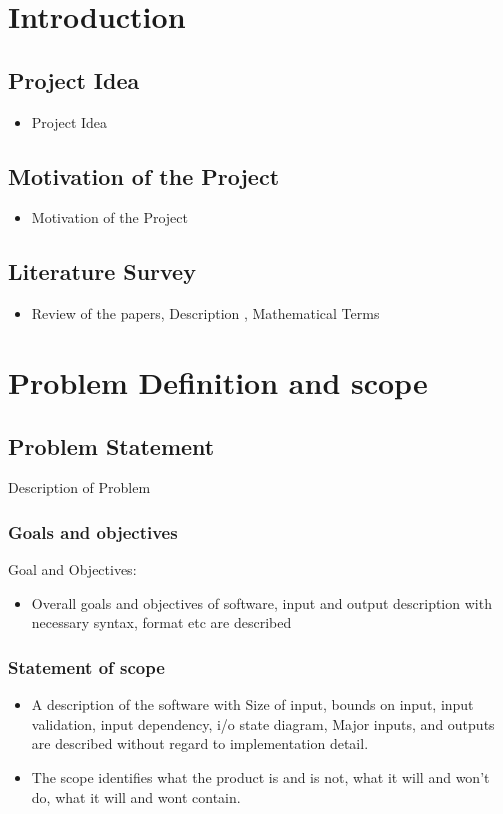 \documentclass[oneside,a4paper,12pt]{report}
\begin{document}
			
\chapter{Introduction}
\section{Project Idea}
\begin{itemize}
\item Project Idea
\end{itemize}


\section{Motivation of the Project}  
\begin{itemize}
\item Motivation of the Project
\end{itemize}

\section{Literature Survey}
\begin{itemize}
\item Review of the papers, Description , Mathematical Terms 
\end{itemize}


\chapter{Problem Definition and scope}
\section{Problem Statement}
Description of Problem


\subsection{Goals and objectives}  
Goal and Objectives: 
\begin{itemize}
  	\item Overall goals and objectives of software, input and output description with necessary syntax, format etc are described
\end{itemize}

 \subsection{Statement of scope} 
	\begin{itemize}  
	\item	A description of the software with Size of input, bounds on input, input validation, input dependency, i/o state diagram, Major inputs, and outputs are described without regard to implementation detail.
	\item The scope identifies what the product is and is not, what it will and won’t do, what it will and wont contain.
	\end{itemize}
\end{document}
